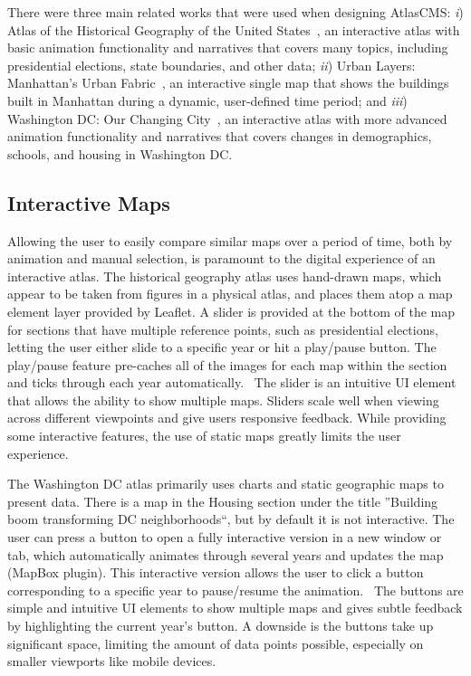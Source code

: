\documentclass[11pt, final, conference, twocolumn]{IEEEtran}
\begin{document}
There were three main related works that were used when designing AtlasCMS: {\it i}) Atlas of the Historical Geography of the United States~\cite{us-historical-atlas-2014}, an interactive atlas with basic animation functionality and narratives that covers many topics, including presidential elections, state boundaries, and other data; {\it ii}) Urban Layers: Manhattan's Urban Fabric~\cite{urban-layers-2014}, an interactive single map that shows the buildings built in Manhattan during a dynamic, user-defined time period; and {\it iii}) Washington DC: Our Changing City~\cite{dc-changing-2014}, an interactive atlas with more advanced animation functionality and narratives that covers changes in demographics, schools, and housing in Washington DC.

\subsection{Interactive Maps}
Allowing the user to easily compare similar maps over a period of time, both by animation and manual selection, is paramount to the digital experience of an interactive atlas. The historical geography atlas uses hand-drawn maps, which appear to be taken from figures in a physical atlas, and places them atop a map element layer provided by Leaflet. A slider is provided at the bottom of the map for sections that have multiple reference points, such as presidential elections, letting the user either slide to a specific year or hit a play/pause button.  The play/pause feature pre-caches all of the images for each map within the section and ticks through each year automatically.~\cite{us-historical-atlas-2014} The slider is an intuitive UI element that allows the ability to show multiple maps. Sliders scale well when viewing across different viewpoints and give users responsive feedback. While providing some interactive features, the use of static maps greatly limits the user experience.

The Washington DC atlas primarily uses charts and static geographic maps to present data. There is a map in the Housing section under the title ''Building boom transforming DC neighborhoods``, but by default it is not interactive. The user can press a button to open a fully interactive version in a new window or tab, which automatically animates through several years and updates the map (MapBox plugin). This interactive version allows the user to click a button corresponding to a specific year to pause/resume the animation.~\cite{dc-changing-2014} The buttons are simple and intuitive UI elements to show multiple maps and gives subtle feedback by highlighting the current year's button. A downside is the buttons take up significant space, limiting the amount of data points possible, especially on smaller viewports like mobile devices.
\end{document}
